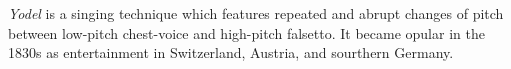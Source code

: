 \emph{Yodel} is a singing technique which features repeated and abrupt changes of pitch between low-pitch chest-voice and high-pitch falsetto.
It became opular in the 1830s as entertainment in Switzerland, Austria, and sourthern Germany.